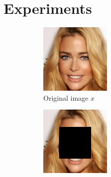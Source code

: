 \section{Experiments}
\label{sec:experiments}

\begin{figure}
    \captionsetup[subfigure]{labelformat=empty}
    \begin{subfigure}{.135\textwidth}
        \includegraphics[width=\textwidth]{Chapter2/samples/diversity/x.png}
        \caption{\scriptsize Original image $x$}
    \end{subfigure}
    \begin{subfigure}{.135\textwidth}
        \includegraphics[width=\textwidth]{Chapter2/samples/diversity/y.png}

\end{subfigure}
\end{figure}
